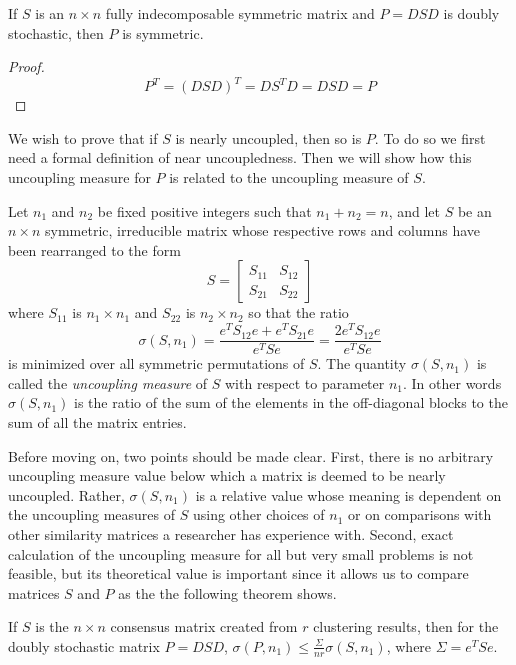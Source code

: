 \documentclass[final]{siamltex}
\begin{document}
\begin{lemma} 
If $S$ is an $n \times n$ fully indecomposable symmetric matrix and $P=DSD$ is doubly stochastic, then $P$ is symmetric.
\end{lemma}

\begin{proof}
\begin{equation}
P^{T} = (DSD)^{T} = DS^{T} D =  DSD = P 
\end{equation} 
\end{proof}

We wish to prove that if $S$ is nearly uncoupled, then so is $P$. To do so we first need a formal definition of near uncoupledness. Then we will show how this uncoupling measure for $P$ is related to the uncoupling measure of $S$.

\begin{definition} \label{def:sigma} 
Let $n_{1}$ and $n_{2}$ be fixed positive integers such that $n_{1}+n_{2}=n$, and let $S$ be an $n \times n$ symmetric, irreducible matrix whose respective rows and columns have been rearranged to the form
\[
S= \left[
\begin{array}{cc}
 S_{11} & S_{12}     \\
 S_{21} & S_{22}  
\end{array}
\right]
\]
where $S_{11}$ is $n_{1} \times n_{1}$  and $S_{22}$  is $n_{2} \times n_{2}$ so that the ratio
\[
\sigma(S,n_{1})=
\frac{e^{T}S_{12}e+e^{T}S_{21}e}   {e^{T}Se} = 
\frac{2e^{T}S_{12}e}   {e^{T}Se}
\]
is minimized over all symmetric permutations of $S$. The quantity $\sigma(S,n_{1})$ is called the \emph{uncoupling measure} of $S$ with respect to parameter $n_{1}$. In other words $\sigma(S,n_{1})$ is the ratio of the sum of the elements in the off-diagonal blocks to the sum of all the matrix entries.
\end{definition}

Before moving on, two points should be made clear. First, there is no arbitrary uncoupling measure value below which a matrix is deemed to be nearly uncoupled. Rather, $\sigma(S,n_{1})$ is a relative value whose meaning is dependent on the uncoupling measures of $S$ using other choices of $n_{1}$ or on comparisons with other similarity matrices a researcher has experience with. Second, exact calculation of the uncoupling measure for all but very small problems is not feasible, but its theoretical value is  important since it allows us to compare matrices $S$ and $P$ as the the following theorem shows.

\begin{theorem} \label{th:sigma} 
If $S$ is the $n \times n$ consensus matrix created from $r$ clustering results, then for the doubly stochastic matrix $P=DSD$, $\sigma(P,n_{1}) \le \frac{\Sigma}{nr}\sigma(S,n_{1}) $, where $\Sigma = e^{T}Se$.
\end{theorem}
\end{document}
